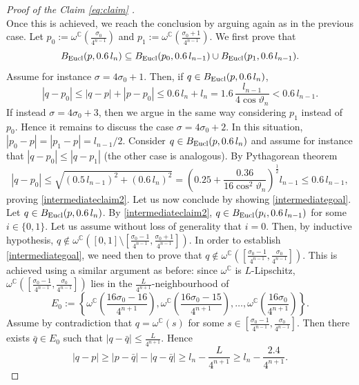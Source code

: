 \documentclass[12pt]{amsart}
\newcommand{\C}{\mathbb C}
\renewcommand{\theta}{\vartheta}
\numberwithin{equation}{section}
\theoremstyle{plain}
\theoremstyle{definition}
\theoremstyle{remark}
\begin{document}
\begin{proof}[Proof of the Claim \eqref{eq:claim} ]
\begin{equation}
 \end{equation}
 Once this is achieved, we reach the conclusion by arguing again as in the previous case.  %
 Let $p_0:=\omega^\C(\frac{\sigma_0}{{4^{n-1}}})$ and $p_1:=\omega^\C(\frac{\sigma_0+1}{4^{n-1}})$. We first prove that
 \begin{equation}\label{intermediateclaim2} B_{\rm Eucl}(p,0.6\,l_n)\subseteq  B_{\rm Eucl}(p_0,0.6\,l_{n-1})\cup B_{\rm Eucl}(p_1,0.6\,l_{n-1}). \end{equation}
Assume for instance $\sigma=4\sigma_0+1$. Then, if $q\in B_{\rm Eucl}(p, 0.6\,l_n)$, 
\[|q-p_0|\leq |q-p|+|p-p_0|\leq 0.6\,l_n+l_n=1.6\,\frac{l_{n-1}}{4\cos \theta_n}<0.6\,l_{n-1}.\]
 If instead $\sigma=4\sigma_0+3$, then we argue in the same way considering $p_1$ instead of $p_0$. Hence it remains to discuss the case $\sigma=4\sigma_0+2$. In this situation, $|p_0-p|=|p_1-p|=l_{n-1}/2$. Consider $q\in B_{\rm Eucl}(p, 0.6\,l_n)$ and assume for instance that $|q-p_0|\leq |q-p_1|$ (the other case is analogous). By Pythagorean theorem 
 \[|q-p_0|\leq\sqrt{ (0.5 \,l_{n-1})^2+(0.6\,l_n)^2}=\left(0.25+\frac{0.36}{16\cos^2\theta_n}\right)^\frac{1}{2}l_{n-1}\leq 0.6\,l_{n-1},\]
proving \eqref{intermediateclaim2}. Let us now conclude by showing \eqref{intermediategoal}.\medskip\\
Let $q\in B_{\rm Eucl}(p, 0.6\,l_n)$. By \eqref{intermediateclaim2}, $q\in B_{\rm Eucl}(p_i, 0.6\,l_{n-1})$ for some $i\in\{0,1\}$. Let us assume without loss of generality that $i=0$. Then, by inductive hypothesis, $q\not\in \omega^\C([0,1]\setminus\left[\frac{\sigma_0-1}{4^{n-1}},\frac{\sigma_0+1}{4^{n-1}}\right])$. In order to establish \eqref{intermediategoal}, we need then to prove that $q\not\in \omega^\C\left(\left[\frac{\sigma_0-1}{4^{n-1}},\frac{\sigma_0}{4^{n-1}}\right]\right)$. 
This is achieved using a similar argument as before: since $\omega^\C$ is $L$-Lipschitz, $\omega^\C\left(\left[\frac{\sigma_0-1}{4^{n-1}},\frac{\sigma_0}{4^{n-1}}\right]\right)$ lies in the $\frac{L}{4^{n+1}}$-neighbourhood of 
\[E_0:=\left\{\omega^\C\left(\frac{16\sigma_0-16}{4^{n+1}}\right),\omega^\C\left(\frac{16\sigma_0-15}{4^{n+1}}\right),\dots,\omega^\C\left(\frac{16\sigma_0}{4^{n+1}}\right)\right\}.\]
Assume by contradiction that $q=\omega^\C(s)$ for some $s\in \left[\frac{\sigma_0-1}{4^{n-1}},\frac{\sigma_0}{4^{n-1}}\right]$. Then there exists $\bar q\in E_0$ such that $|q-\bar q|\leq \frac{L}{4^{n+1}}$. Hence
\begin{equation}\label{eq:ball_est}
|q-p|\geq |p-\bar q|-|q-\bar q|\geq l_n-\frac{L}{4^{n+1}}\geq l_n-\frac{2.4}{4^{n+1}}.

\end{equation}
\end{proof}
\end{document}
